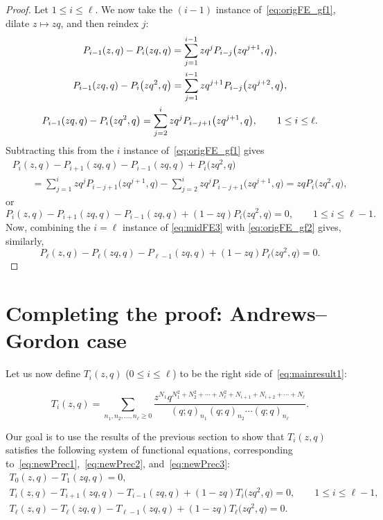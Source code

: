 \documentclass[pdftex]{sigma}
\numberwithin{equation}{section}
\theoremstyle{definition}
\begin{document}
\begin{proof}
Let $1\le i \le \ell$. We now take the $(i-1)$ instance of~\eqref{eq:origFE_gf1}, dilate $z\mapsto zq$, and then reindex $j$:
\begin{gather}
P_{i-1}(z,q) - P_{i}(zq,q) = \sum_{j=1}^{i-1} zq^j P_{i-j}\bigl(zq^{j+1},q\bigr), \notag \\
P_{i-1}(zq,q) - P_{i}\bigl(zq^2,q\bigr) = \sum_{j=1}^{i-1} zq^{j+1} P_{i-j}\bigl(zq^{j+2},q\bigr), \notag \\
P_{i-1}(zq,q) - P_{i}\bigl(zq^2,q\bigr) = \sum_{j=2}^{i} zq^{j} P_{i-j+1}\bigl(zq^{j+1},q\bigr), \qquad 1 \le i \le \ell. \label{eq:midFE3}
\end{gather}
Subtracting this from the $i$ instance of~\eqref{eq:origFE_gf1} gives
\begin{gather*}
P_i(z,q) - P_{i+1}(zq,q) - P_{i-1}(zq,q) + P_{i}\bigl(zq^2,q\bigr) \\
\qquad = \sum_{j=1}^i zq^j P_{i-j+1}\bigl(zq^{j+1},q\bigr) -\sum_{j=2}^{i} zq^{j} P_{i-j+1}\bigl(zq^{j+1},q\bigr) = zqP_i\bigl(zq^2,q\bigr), \label{eq:a7}
\end{gather*}
or
\begin{equation*}
P_i(z,q) - P_{i+1}(zq,q) - P_{i-1}(zq,q) + (1-zq)P_{i}\bigl(zq^2,q\bigr) =0, \qquad 1 \le i \le \ell-1.
\end{equation*}
Now, combining the $i=\ell$ instance of \eqref{eq:midFE3} with \eqref{eq:origFE_gf2} gives, similarly,
\begin{equation}
P_\ell(z,q) - P_\ell(zq,q) -P_{\ell-1}(zq,q) + (1-zq) P_{\ell}\bigl(zq^2,q\bigr) = 0. \tag*{\qed}
\end{equation}
\renewcommand{\qed}{}
\end{proof}

\section{Completing the proof: Andrews--Gordon case}\label{sec:comp}

Let us now define $T_i(z,q)$ ($0\le i \le \ell$) to be the right side of~\eqref{eq:mainresult1}:

\begin{equation} \label{eq:Tdef}
T_i(z,q)=\sum_{n_1,n_2,\dots,n_{\ell}\ge 0} \frac{z^{N_1}q^{N_1^2+N_2^2+\cdots+N_{\ell}^2+N_{i+1}+N_{i+2}+\cdots+N_{\ell}}}{(q;q)_{n_1}(q;q)_{n_2}\cdots(q;q)_{n_{\ell}}}.
\end{equation}

Our goal is to use the results of the previous section to show that $T_i(z,q)$ satisfies the following system of functional equations, corresponding to~\eqref{eq:newPrec1},~\eqref{eq:newPrec2}, and~\eqref{eq:newPrec3}:
\begin{gather}
T_0(z,q)-T_1(zq,q) =0, \label{eq:newTrec1} \\
T_i(z,q) - T_{i+1}(zq,q) - T_{i-1}(zq,q) + (1-zq)T_{i}\bigl(zq^2,q\bigr) =0, \qquad 1 \le i \le \ell-1, \label{eq:newTrec2} \\
T_\ell(z,q) - T_\ell(zq,q) -T_{\ell-1}(zq,q) + (1-zq) T_{\ell}\bigl(zq^2,q\bigr) = 0. \label{eq:newTrec3}
\end{gather}
\end{document}
